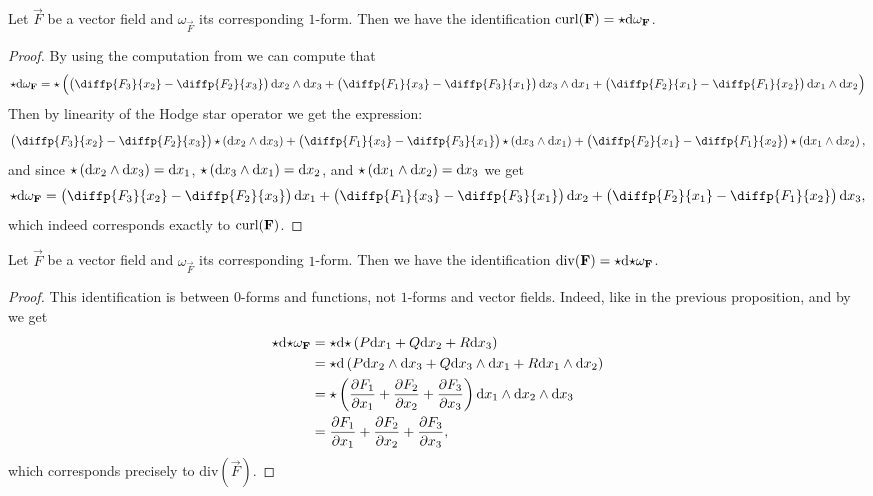\documentclass[11pt,a4paper]{article}
\renewcommand{\div}{\mathrm{div}}
\begin{document}
\begin{proposition}
  \label{prop:curl-with-hodge}
  Let $\vec F$ be a vector field and $\omega_{\vec F}$ its corresponding
  $1$-form.
  Then we have the identification $\operatorname{curl}(\boldsymbol{\mathbf{F}}) = {\mathnormal{\star}} \mathrm{d} \omega_{\boldsymbol{\mathbf{F}}}$.
\end{proposition}
\begin{proof}
  By using the computation from 
  we can compute that
  \[
    \hodge \dif \omega_{\vec F} =
    \hodge\del{
    \del{\diffp{{F_3}}{{x_2}} - \diffp{{F_2}}{{x_3}}} \dx_2 \wedge \dx_3 +
    \del{\diffp{{F_1}}{{x_3}} - \diffp{{F_3}}{{x_1}}} \dx_3 \wedge \dx_1 +
    \del{\diffp{{F_2}}{{x_1}} - \diffp{{F_1}}{{x_2}}} \dx_1 \wedge \dx_2}
  \]
  Then by linearity of the Hodge star operator we get the expression:
  \[
  \del{\diffp{{F_3}}{{x_2}} - \diffp{{F_2}}{{x_3}}} \hodge\del{\dx_2 \wedge \dx_3} +
  \del{\diffp{{F_1}}{{x_3}} - \diffp{{F_3}}{{x_1}}} \hodge\del{\dx_3 \wedge \dx_1} +
  \del{\diffp{{F_2}}{{x_1}} - \diffp{{F_1}}{{x_2}}} \hodge\del{\dx_1 \wedge \dx_2},
  \]
  and since $\hodge\del{\dx_2 \wedge \dx_3} = \dx_1$,
  $\hodge\del{\dx_3 \wedge \dx_1} = \dx_2$,
  and $\hodge\del{\dx_1 \wedge \dx_2} = \dx_3$ we get
  \[
    \hodge \dif \omega_{\vec F} =
  \del{\diffp{{F_3}}{{x_2}} - \diffp{{F_2}}{{x_3}}} \dx_1 +
  \del{\diffp{{F_1}}{{x_3}} - \diffp{{F_3}}{{x_1}}} \dx_2 +
  \del{\diffp{{F_2}}{{x_1}} - \diffp{{F_1}}{{x_2}}} \dx_3,
  \]
  which indeed corresponds exactly to $\operatorname{curl}(\boldsymbol{\mathbf{F}})$.
\end{proof}

\begin{proposition}
  \label{prop:div-with-hodge}
  Let $\vec F$ be a vector field and $\omega_{\vec F}$ its corresponding
  $1$-form.
  Then we have the identification
  $\div(\vec F) = \hodge \dif \hodge \omega_{\vec F}$.
\end{proposition}
\begin{proof}
  This identification is between $0$-forms and functions,
  not $1$-forms and vector fields.
  Indeed, like in the previous proposition,
  and by  we get
  \begin{align*}
    \hodge \dif \hodge \omega_{\vec F} &=
    \hodge \dif \hodge \del{P \dx_1 + Q \dx_2 + R \dx_3} \\ &=
    \hodge \dif \del{P \dx_2 \wedge \dx_3 + Q \dx_3 \wedge \dx_1 + R \dx_1 \wedge \dx_2} \\ &=
    \hodge \del{\frac{\partial F_1}{\partial x_1} + \frac{\partial F_2}{\partial x_2} + \frac{\partial F_3}{\partial x_3}} \dx_1 \wedge \dx_2 \wedge \dx_3 \\ &=
    \frac{\partial F_1}{\partial x_1} + \frac{\partial F_2}{\partial x_2} + \frac{\partial F_3}{\partial x_3},
  \end{align*}
  which corresponds precisely to $\div(\vec F)$.
\end{proof}
\end{document}
